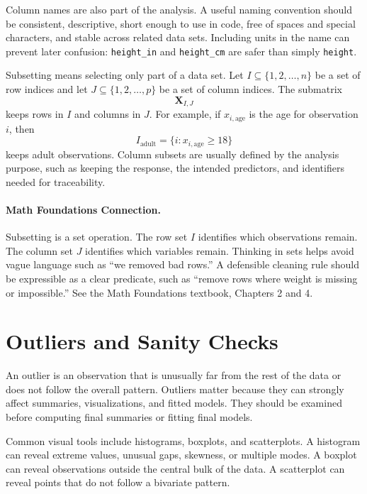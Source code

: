 {Column names are also part of the analysis.  A useful naming convention should be consistent, descriptive, short enough to use in code, free of spaces and special characters, and stable across related data sets.  Including units in the name can prevent later confusion: \texttt{height\_in} and \texttt{height\_cm} are safer than simply \texttt{height}.

Subsetting means selecting only part of a data set.  Let $I\subseteq\{1,2,\ldots,n\}$ be a set of row indices and let $J\subseteq\{1,2,\ldots,p\}$ be a set of column indices.  The submatrix
\[
  \mathbf{X}_{I,J}
\]
keeps rows in $I$ and columns in $J$.  For example, if $x_{i,\text{age}}$ is the age for observation $i$, then
\begin{equation}
  I_{\text{adult}}=\{i:x_{i,\text{age}}\geq 18\}
  \label{eq:ch3-adult-subset}
\end{equation}
keeps adult observations.  Column subsets are usually defined by the analysis purpose, such as keeping the response, the intended predictors, and identifiers needed for traceability.

\paragraph{Math Foundations Connection.}
Subsetting is a set operation.  The row set $I$ identifies which observations remain.  The column set $J$ identifies which variables remain.  Thinking in sets helps avoid vague language such as ``we removed bad rows.''  A defensible cleaning rule should be expressible as a clear predicate, such as ``remove rows where weight is missing or impossible.''  See the Math Foundations textbook, Chapters 2 and 4.

\section{Outliers and Sanity Checks}

An outlier is an observation that is unusually far from the rest of the data or does not follow the overall pattern.  Outliers matter because they can strongly affect summaries, visualizations, and fitted models.  They should be examined before computing final summaries or fitting final models.

Common visual tools include histograms, boxplots, and scatterplots.  A histogram can reveal extreme values, unusual gaps, skewness, or multiple modes.  A boxplot can reveal observations outside the central bulk of the data.  A scatterplot can reveal points that do not follow a bivariate pattern.

}
